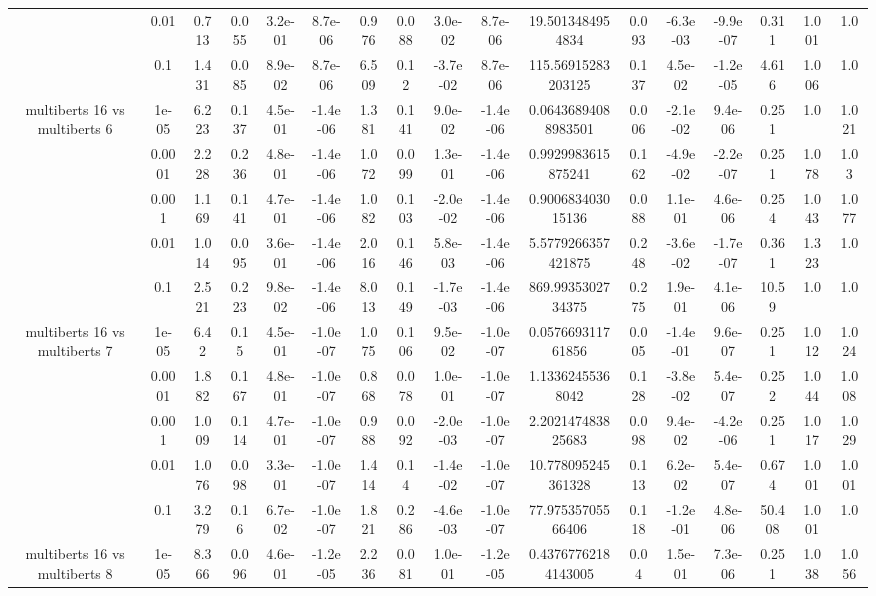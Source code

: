 \begin{tabular}{|c|c|c|c|c|c|c|c|c|c|c|c|c|c|c|c|c|}
 & 0.01 & 0.713 & 0.055 & 3.2e-01 & 8.7e-06 & 0.976 & 0.088 & 3.0e-02 & 8.7e-06 & 19.5013484954834 & 0.093 & -6.3e-03 & -9.9e-07 & 0.311 & 1.001 & 1.0 \\
 & 0.1 & 1.431 & 0.085 & 8.9e-02 & 8.7e-06 & 6.509 & 0.12 & -3.7e-02 & 8.7e-06 & 115.56915283203125 & 0.137 & 4.5e-02 & -1.2e-05 & 4.616 & 1.006 & 1.0 \\
\hline
\multirow{5}{*}{multiberts 16 vs multiberts 6} & 1e-05 & 6.223 & 0.137 & 4.5e-01 & -1.4e-06 & 1.381 & 0.141 & 9.0e-02 & -1.4e-06 & 0.06436894088983501 & 0.006 & -2.1e-02 & 9.4e-06 & 0.251 & 1.0 & 1.021 \\
 & 0.0001 & 2.228 & 0.236 & 4.8e-01 & -1.4e-06 & 1.072 & 0.099 & 1.3e-01 & -1.4e-06 & 0.9929983615875241 & 0.162 & -4.9e-02 & -2.2e-07 & 0.251 & 1.078 & 1.03 \\
 & 0.001 & 1.169 & 0.141 & 4.7e-01 & -1.4e-06 & 1.082 & 0.103 & -2.0e-02 & -1.4e-06 & 0.900683403015136 & 0.088 & 1.1e-01 & 4.6e-06 & 0.254 & 1.043 & 1.077 \\
 & 0.01 & 1.014 & 0.095 & 3.6e-01 & -1.4e-06 & 2.016 & 0.146 & 5.8e-03 & -1.4e-06 & 5.5779266357421875 & 0.248 & -3.6e-02 & -1.7e-07 & 0.361 & 1.323 & 1.0 \\
 & 0.1 & 2.521 & 0.223 & 9.8e-02 & -1.4e-06 & 8.013 & 0.149 & -1.7e-03 & -1.4e-06 & 869.9935302734375 & 0.275 & 1.9e-01 & 4.1e-06 & 10.59 & 1.0 & 1.0 \\
\hline
\multirow{5}{*}{multiberts 16 vs multiberts 7} & 1e-05 & 6.42 & 0.15 & 4.5e-01 & -1.0e-07 & 1.075 & 0.106 & 9.5e-02 & -1.0e-07 & 0.057669311761856 & 0.005 & -1.4e-01 & 9.6e-07 & 0.251 & 1.012 & 1.024 \\
 & 0.0001 & 1.882 & 0.167 & 4.8e-01 & -1.0e-07 & 0.868 & 0.078 & 1.0e-01 & -1.0e-07 & 1.13362455368042 & 0.128 & -3.8e-02 & 5.4e-07 & 0.252 & 1.044 & 1.008 \\
 & 0.001 & 1.009 & 0.114 & 4.7e-01 & -1.0e-07 & 0.988 & 0.092 & -2.0e-03 & -1.0e-07 & 2.202147483825683 & 0.098 & 9.4e-02 & -4.2e-06 & 0.251 & 1.017 & 1.029 \\
 & 0.01 & 1.076 & 0.098 & 3.3e-01 & -1.0e-07 & 1.414 & 0.14 & -1.4e-02 & -1.0e-07 & 10.778095245361328 & 0.113 & 6.2e-02 & 5.4e-07 & 0.674 & 1.001 & 1.001 \\
 & 0.1 & 3.279 & 0.16 & 6.7e-02 & -1.0e-07 & 1.821 & 0.286 & -4.6e-03 & -1.0e-07 & 77.97535705566406 & 0.118 & -1.2e-01 & 4.8e-06 & 50.408 & 1.001 & 1.0 \\
\hline
\multirow{5}{*}{multiberts 16 vs multiberts 8} & 1e-05 & 8.366 & 0.096 & 4.6e-01 & -1.2e-05 & 2.236 & 0.081 & 1.0e-01 & -1.2e-05 & 0.43767762184143005 & 0.04 & 1.5e-01 & 7.3e-06 & 0.251 & 1.038 & 1.056 \\

\end{tabular}
